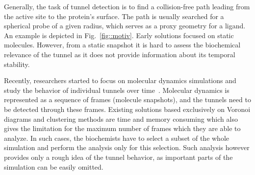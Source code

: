 \documentclass{llncs}
\begin{document}



Generally, the task of tunnel detection is to find a collision-free path leading from the active site to the protein's surface. 
The path is usually searched for a spherical probe of a given radius, which serves as a proxy geometry for a ligand. 
An example is depicted in Fig.~\ref{fig::motiv}.
Early solutions focused on static molecules. 
However, from a static snapshot it is hard to assess the biochemical relevance of the tunnel as it does not
provide information about its temporal stability. 

Recently, researchers started to focus on molecular dynamics simulations and study the behavior of individual tunnels over time~\cite{yaffe2008,caver3,sehnal2013mole}.
Molecular dynamics is represented as a sequence of frames (molecule snapshots), and the tunnels need to be detected through these frames.
Existing solutions based exclusively on Voronoi diagrams and clustering methods are time and memory consuming
which also gives the limitation for the maximum number of frames which they are able to analyze.
In such cases, the biochemists have to select a subset of the whole simulation and perform the analysis only for this selection.
Such analysis however provides only a rough idea of the tunnel behavior, as important parts of the simulation can be easily omitted.
\end{document}
